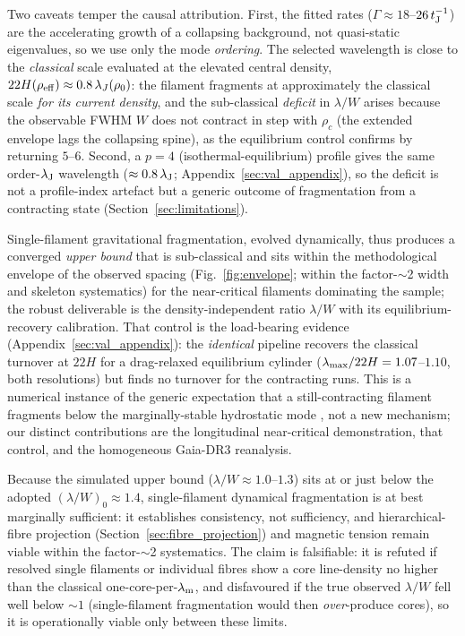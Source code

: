 \documentclass[usenatbib,twoside,twocolumn]{mnras}
\begin{document}
Two caveats temper the causal attribution. First, the fitted rates ($\Gamma\approx18$--$26\,t_{\rm J}^{-1}$) are the accelerating growth of a collapsing background, not quasi-static eigenvalues, so we use only the mode \emph{ordering}. The selected wavelength is close to the \emph{classical} scale evaluated at the elevated central density, $22H(\rho_{\rm eff})\approx0.8\,\lambda_J(\rho_0)$: the filament fragments at approximately the classical scale \emph{for its current density}, and the sub-classical \emph{deficit} in $\lambda/W$ arises because the observable FWHM $W$ does not contract in step with $\rho_c$ (the extended envelope lags the collapsing spine), as the equilibrium control confirms by returning $5$--$6$. Second, a $p=4$ (isothermal-equilibrium) profile gives the same order-$\lambda_{\rm J}$ wavelength ($\approx0.8\,\lambda_{\rm J}$; Appendix~\ref{sec:val_appendix}), so the deficit is not a profile-index artefact but a generic outcome of fragmentation from a contracting state (Section~\ref{sec:limitations}).

Single-filament gravitational fragmentation, evolved dynamically, thus produces a converged \emph{upper bound} that is sub-classical and sits within the methodological envelope of the observed spacing (Fig.~\ref{fig:envelope}; within the factor-$\sim$2 width and skeleton systematics) for the near-critical filaments dominating the sample; the robust deliverable is the density-independent ratio $\lambda/W$ with its equilibrium-recovery calibration. That control is the load-bearing evidence (Appendix~\ref{sec:val_appendix}): the \emph{identical} pipeline recovers the classical turnover at $22H$ for a drag-relaxed equilibrium cylinder ($\lambda_{\rm max}/22H=1.07$--$1.10$, both resolutions) but finds no turnover for the contracting runs. This is a numerical instance of the generic expectation that a still-contracting filament fragments below the marginally-stable hydrostatic mode \citep{Clarke2016,Clarke2017,Clarke2020}, not a new mechanism; our distinct contributions are the longitudinal near-critical demonstration, that control, and the homogeneous Gaia-DR3 reanalysis.

Because the simulated upper bound ($\lambda/W\approx1.0$--$1.3$) sits at or just below the adopted $(\lambda/W)_0\approx1.4$, single-filament dynamical fragmentation is at best marginally sufficient: it establishes consistency, not sufficiency, and hierarchical-fibre projection (Section~\ref{sec:fibre_projection}) and magnetic tension remain viable within the factor-$\sim$2 systematics. The claim is falsifiable: it is refuted if resolved single filaments or individual fibres show a core line-density no higher than the classical one-core-per-$\lambda_{\rm m}$, and disfavoured if the true observed $\lambda/W$ fell well below $\sim1$ (single-filament fragmentation would then \emph{over}-produce cores), so it is operationally viable only between these limits.
\end{document}
